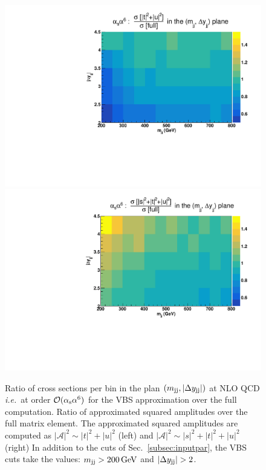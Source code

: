 \begin{figure}[hbt]
\centering
{\includegraphics[scale=0.395]{figures/scanfigures/a6as_vbfnloVSrecola_tu.pdf}}
{\includegraphics[scale=0.395]{figures/scanfigures/a6as_vbfnloVSrecola_stu.pdf}}
\caption{Ratio of cross sections per bin in the plan $\left(m_{\text{j}\text{j}}, |\Delta y_{\text{j}\text{j}}| \right)$ at NLO QCD \emph{i.e.}\ at order $\mathcal{O}(\alpha_\text{s}\alpha^6)$ for the VBS approximation over the full computation.
Ratio of approximated squared amplitudes over the full matrix element.
The approximated squared amplitudes are computed as $|\mathcal{A}|^2 \sim |t|^2 + |u|^2$ (left) and $|\mathcal{A}|^2 \sim |s|^2 + |t|^2 + |u|^2$ (right)
In addition to the cuts of Sec.~\ref{subsec:inputpar}, the VBS cuts take the values: $m_{\text{j}\text{j}}>200 \,\text{GeV}$ and $|\Delta y_{\Pj\Pj}|>2$.}
\label{fig:ratio2d_NLO}
\end{figure}
%

